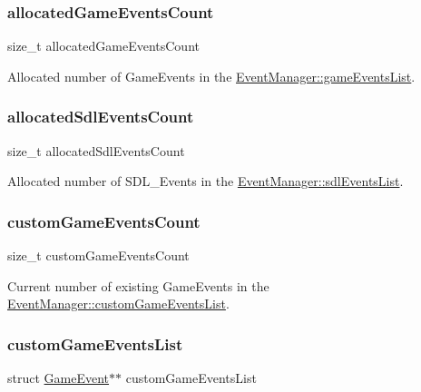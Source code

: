 \subsubsection{\texorpdfstring{allocated\+Game\+Events\+Count}{allocatedGameEventsCount}}
{\footnotesize\ttfamily size\+\_\+t allocated\+Game\+Events\+Count}

Allocated number of Game\+Events in the \hyperlink{struct_event_manager_aa2b0ad79c0a87b310b5adf8feaf9ffd4}{Event\+Manager\+::game\+Events\+List}. \hypertarget{struct_event_manager_a94a2584717ebaf6d143148d5c8b5bf7e}{}\label{struct_event_manager_a94a2584717ebaf6d143148d5c8b5bf7e} 
\subsubsection{\texorpdfstring{allocated\+Sdl\+Events\+Count}{allocatedSdlEventsCount}}
{\footnotesize\ttfamily size\+\_\+t allocated\+Sdl\+Events\+Count}

Allocated number of S\+D\+L\+\_\+\+Events in the \hyperlink{struct_event_manager_ac563054d2cefbd8d20b1daf70eb35d78}{Event\+Manager\+::sdl\+Events\+List}. \hypertarget{struct_event_manager_a44bc521b94d679d4a5566cd59866c259}{}\label{struct_event_manager_a44bc521b94d679d4a5566cd59866c259} 
\subsubsection{\texorpdfstring{custom\+Game\+Events\+Count}{customGameEventsCount}}
{\footnotesize\ttfamily size\+\_\+t custom\+Game\+Events\+Count}

Current number of existing Game\+Events in the \hyperlink{struct_event_manager_a72dc8ad68e1875aed6c94372ff3a51ce}{Event\+Manager\+::custom\+Game\+Events\+List}. \hypertarget{struct_event_manager_a72dc8ad68e1875aed6c94372ff3a51ce}{}\label{struct_event_manager_a72dc8ad68e1875aed6c94372ff3a51ce} 
\subsubsection{\texorpdfstring{custom\+Game\+Events\+List}{customGameEventsList}}
{\footnotesize\ttfamily struct \hyperlink{struct_game_event}{Game\+Event}$\ast$$\ast$ custom\+Game\+Events\+List}

